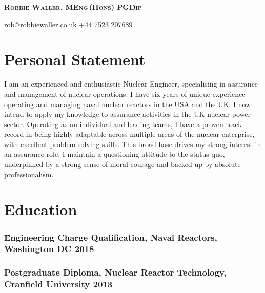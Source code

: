 \documentclass[a4paper, oneside, final, 11pt]{scrartcl} %
\begin{document}


{\fontsize{21}{21}\bfseries\scshape{Robbie Waller, MEng\,(Hons) PGDip}} %

\medskip

\faEnvelopeO \space rob@robbiewaller.co.uk \hfill  \faMobile \space +44 7523 207689

\smallskip

\section{Personal Statement}

I am an experienced and enthusiastic Nuclear Engineer, specialising in assurance and management of nuclear operations. I have six years of unique experience operating and managing naval nuclear reactors in the USA and the UK. I now intend to apply my knowledge to assurance activities in the UK nuclear power sector. Operating as an individual and leading teams, I have a proven track record in being highly adaptable across multiple areas of the nuclear enterprise, with excellent problem solving skills. This broad base drives my strong interest in an assurance role. I maintain a questioning attitude to the status-quo, underpinned by a strong sense of moral courage and backed up by absolute professionalism. 

\section{Education}

\subsubsection*{Engineering Charge Qualification,\textnormal{ Naval Reactors, Washington DC} \hfill 2018} 
\smallskip
\subsubsection*{Postgraduate Diploma, \textnormal{Nuclear Reactor Technology, Cranfield University} \hfill 2013}  
\smallskip
\end{document}
